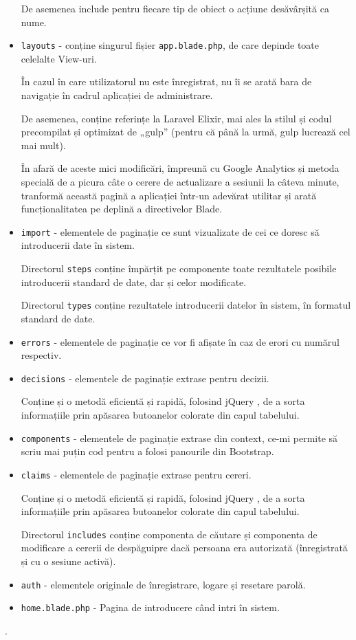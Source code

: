 \begin{itemize}
		De asemenea include pentru fiecare tip de obiect o acțiune desăvârșită ca nume.
		\item \verb|layouts| - conține singurul fișier \verb|app.blade.php|, de care depinde toate celelalte View-uri.

		În cazul în care utilizatorul nu este înregistrat, nu îi se arată bara de navigație în cadrul aplicației de administrare.

		De asemenea, conține referințe la Laravel Elixir, mai ales la stilul și codul precompilat și optimizat de „gulp” (pentru că până la urmă, gulp lucrează cel mai mult).

		În afară de aceste mici modificări, împreună cu Google Analytics și metoda specială de a picura câte o cerere de actualizare a sesiunii la câteva minute, tranformă această pagină a aplicației într-un adevărat utilitar și arată funcționalitatea pe deplină a directivelor Blade.

		\item \verb|import| - elementele de paginație ce sunt vizualizate de cei ce doresc să introducerii date în sistem.

		Directorul \verb|steps| conține împărțit pe componente toate rezultatele posibile introducerii standard de date, dar și celor modificate.

		Directorul \verb|types| conține rezultatele introducerii datelor în sistem, în formatul standard de date.

		\item \verb|errors| - elementele de paginație ce vor fi afișate în caz de erori cu numărul respectiv.

		\item \verb|decisions| - elementele de paginație extrase pentru decizii.

		Conține și o metodă eficientă și rapidă, folosind jQuery , de a sorta informațiile prin apăsarea butoanelor colorate din capul tabelului.
		\item \verb|components| - elementele de paginație extrase din context, ce-mi permite să scriu mai puțin cod pentru a folosi panourile din Bootstrap.
		\item \verb|claims| -  elementele de paginație extrase pentru cereri.

		Conține și o metodă eficientă și rapidă, folosind jQuery , de a sorta informațiile prin apăsarea butoanelor colorate din capul tabelului.

		Directorul \verb|includes| conține componenta de căutare și componenta de modificare a cererii de despăguipre dacă persoana era autorizată (înregistrată și cu o sesiune activă).

		\item \verb|auth| - elementele originale de înregistrare, logare și resetare parolă.
		\item \verb|home.blade.php| - Pagina de introducere când intri în sistem.
	\end{itemize}
.
